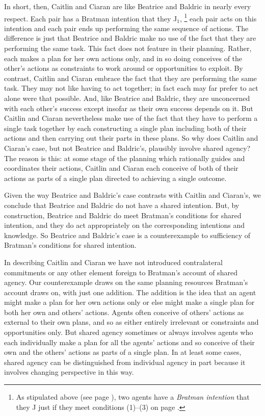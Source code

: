 \documentclass[12pt,\papersize]{extarticle}
\begin{document}
In short, then, Caitlin and Ciaran are like Beatrice and Baldric in nearly every respect. 
Each pair has a Bratman intention that they J$_1$,%
\footnote{
As stipulated above (see page \pageref*{df:bratman_intention}), 
two agents have a \emph{Bratman intention} that they J just if they meet conditions (1)--(3) on page \pageref{quote:bratman_account}.
}
%
 each pair acts on this intention and each pair ends up performing the same sequence of actions.
The difference is just that Beatrice and Baldric make no use of the fact that they are performing the same task.
	This fact does not feature in their planning. 
	Rather, each makes a plan for her own actions only, and in so doing conceives of the other's actions as constraints to work around or opportunities to exploit.
By contrast, Caitlin and Ciaran embrace the fact that they are performing the same task. 
They may not like having to act together; in fact each may far prefer to act alone were that possible.
And, like Beatrice and Baldric, they are unconcerned with each other's success except insofar as their own success depends on it.
But Caitlin and Ciaran nevertheless make use of the fact that they have to perform a single task together by each constructing a single plan including both of their actions and then carrying out their parts in these plans.
So why does Caitlin and Ciaran's case, but not Beatrice and Baldric's, plausibly involve shared agency?
The reason is  this:
	 at some stage of the planning which rationally guides and coordinates their actions,
	Caitlin and Ciaran each conceive of both of their actions as parts of a single plan directed to achieving a single outcome.


Given the way Beatrice and Baldric's case contrasts with Caitlin and Ciaran's,
we conclude that Beatrice and Baldric do not have a shared intention.
But, by construction, 
 Beatrice and Baldric do meet Bratman's conditions for shared intention, and they do act appropriately on the corresponding intentions and knowledge. 
 So Beatrice and Baldric's case  is a counterexample to sufficiency of Bratman's conditions for shared intention.


In describing Caitlin and Ciaran we have not introduced contralateral commitments or any other element foreign to Bratman's account of shared agency. 
Our counterexample draws on the same planning resources Bratman's account draws on, with just one addition.
The addition is the idea that an agent 
	might make a plan for her own actions only 
	or else 
	might make a single plan for both her own and others' actions.
Agents often conceive of others' actions as external to their own plans, and so as either entirely irrelevant or constraints and opportunities only.
But shared agency sometimes or always involves agents who each individually make a plan for all the agents' actions and so conceive of their own and the others' actions  as parts of a single plan.
In at least some cases, shared agency can be distinguished from individual agency in part because it involves changing perspective in this way.
\end{document}
